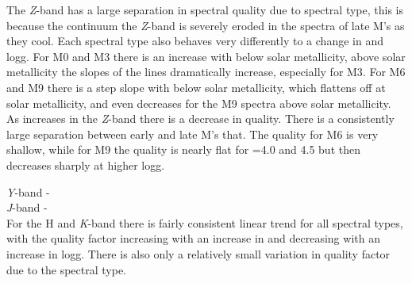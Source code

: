 The \emph{Z}-band has a large separation in spectral quality due to spectral type, this is because the continuum the \emph{Z}-band is severely eroded in the spectra of late M's as they cool. Each spectral type also behaves very differently to a change in \feh{} and logg. For {M0} and {M3} there is an increase with \feh{} below solar metallicity, above solar metallicity the slopes of the lines dramatically increase, especially for {M3}. For {M6} and {M9} there is a step slope with \feh{} below solar metallicity, which flattens off at solar metallicity, and even decreases for the {M9} spectra above solar metallicity.
As \logg{} increases in the \emph{Z}-band there is a decrease in quality. There is a consistently large separation between early and late M's that. The quality for {M6} is very shallow, while for {M9} the quality is nearly flat for \logg{}=4.0 and 4.5 but then decreases sharply at higher logg.

\emph{Y}-band -\\

\emph{J}-band - \\

For the H and \emph{K}-band there is fairly consistent linear trend for all spectral types, with the quality factor increasing with an increase in \feh{} and decreasing with an increase in logg. There is also only a relatively small variation in quality factor due to the spectral type.



